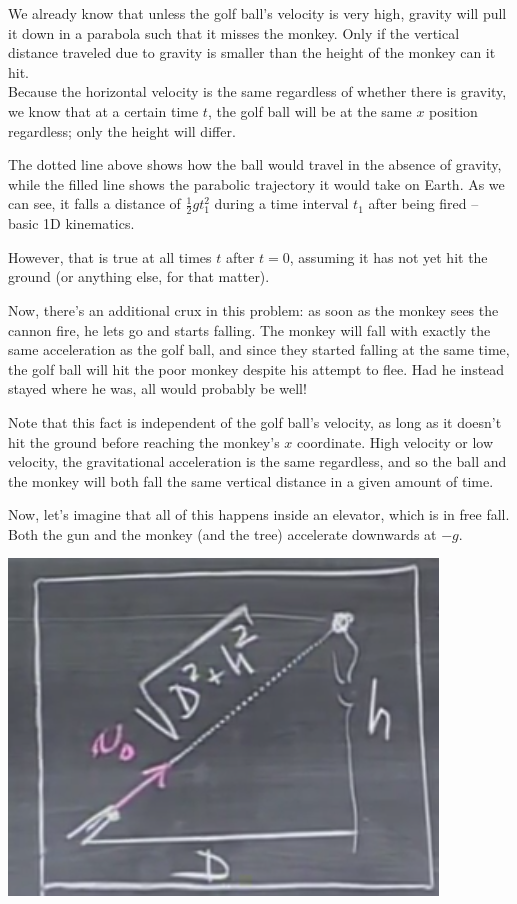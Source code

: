 \documentclass[8.01x]{subfiles}
\begin{document}
We already know that unless the golf ball's velocity is very high, gravity will pull it down in a parabola such that it misses the monkey. Only if the vertical distance traveled due to gravity is smaller than the height of the monkey can it hit.\\
Because the horizontal velocity is the same regardless of whether there is gravity, we know that at a certain time $t$, the golf ball will be at the same $x$ position regardless; only the height will differ.

The dotted line above shows how the ball would travel in the absence of gravity, while the filled line shows the parabolic trajectory it would take on Earth. As we can see, it falls a distance of $\frac{1}{2} g t_1^2$ during a time interval $t_1$ after being fired -- basic 1D kinematics.

However, that is true at all times $t$ after $t = 0$, assuming it has not yet hit the ground (or anything else, for that matter).

Now, there's an additional crux in this problem: as soon as the monkey sees the cannon fire, he lets go and starts falling. The monkey will fall with exactly the same acceleration as the golf ball, and since they started falling at the same time, the golf ball will hit the poor monkey despite his attempt to flee. Had he instead stayed where he was, all would probably be well!

Note that this fact is independent of the golf ball's velocity, as long as it doesn't hit the ground before reaching the monkey's $x$ coordinate. High velocity or low velocity, the gravitational acceleration is the same regardless, and so the ball and the monkey will both fall the same vertical distance in a given amount of time.

Now, let's imagine that all of this happens inside an elevator, which is in free fall. Both the gun and the monkey (and the tree) accelerate downwards at $-g$.

\begin{center}
\includegraphics[scale=0.6]{Graphics/lec4_elevator}
\end{center}
\end{document}
